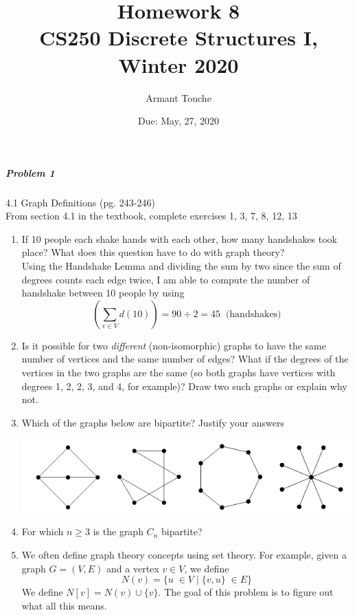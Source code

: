\documentclass[11pt,a4paper]{article}
\title{\bf Homework 8\\[1ex]
\rm\normalsize CS250 Discrete Structures I, Winter 2020 }
\date{\normalsize Due: May, 27, 2020}
\author{\normalsize Armant Touche}
\newcommand\setItemNumber[1]{\setcounter{enumi}{\numexpr#1-1\relax}}
\begin{document}
 
\vspace{0cm}\maketitle 
	
	
	\subparagraph{Problem 1} 4.1 Graph Definitions (pg. 243-246) \\
			
		From section 4.1 in the textbook, complete exercises 1, 3, 7, 8, 12, 13

        \begin{enumerate}

        \item  If 10 people each shake hands with each other, how many handshakes took place? What does this question have to do with graph theory?\\
            Using the Handshake Lemma and dividing the sum by two since the sum of degrees counts each edge twice, I am able to compute the number of handshake between 10 people by using
            $$ (\sum_{v\in V} d(10)) = 90\div 2 = 45\;\;\text{(handshakes)}$$

        \setItemNumber{3}
    \item Is it possible for two \textit{different} (non-isomorphic) graphs to have the same number of vertices and the same number of edges? What if the degrees of the vertices in the two graphs are the same (so both graphs have vertices with degrees 1, 2, 2, 3, and 4, for example)? Draw two such graphs or explain why not.

        \setItemNumber{7}
        \item Which of the graphs below are bipartite? Justify your answers

            \begin{center}
            \includegraphics[width=.5\textwidth]{hw8_graphic1}
            \end{center}

        \item For which $n\geq 3$ is the graph $C_n$ bipartite?

        \setItemNumber{12}
    \item We often define graph theory concepts using set theory. For example, given a graph $G = (V, E)$ and a vertex $v\in V$, we define
        $$N(v) = \{u\;\in V\; |\; \{v,u\}\;\in E\}$$
        We define $N[v] = N(v)\cup \{v\}$. The goal of this problem is to figure out what all this means.
        \begin{enumerate}


\end{enumerate}
\end{enumerate}
\end{document}

